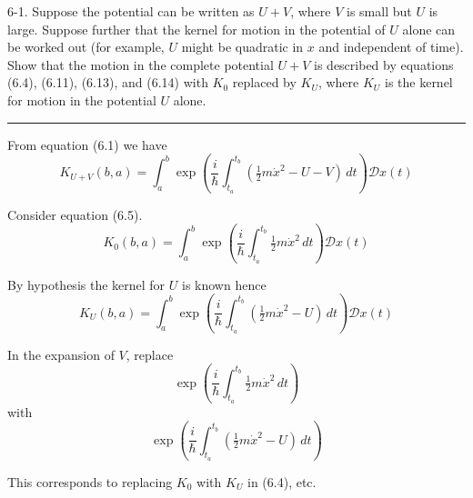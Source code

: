 \documentclass[12pt]{article}
\begin{document}
6-1.
Suppose the potential can be written as $U+V$,
where $V$ is small but $U$ is large.
Suppose further that the kernel for motion in the potential of $U$ alone
can be worked out (for example, $U$ might be quadratic in $x$ and
independent of time).
Show that the motion in the complete potential $U+V$ is described by
equations (6.4), (6.11), (6.13), and (6.14) with $K_0$ replaced by $K_U$,
where $K_U$ is the kernel for motion in the potential $U$ alone.

\bigskip
\hrule

\bigskip
From equation (6.1) we have
\begin{equation*}
K_{U+V}(b,a)=\int_a^b
\exp\left(\frac{i}{\hbar}\int_{t_a}^{t_b}\left(\tfrac{1}{2}m\dot x^2-U-V\right)\,dt\right)
\mathcal Dx(t)
\end{equation*}

Consider equation (6.5).
\begin{equation*}
K_0(b,a)=\int_a^b\exp\left(\frac{i}{\hbar}\int_{t_a}^{t_b}\tfrac{1}{2}m\dot x^2\,dt\right)
\mathcal Dx(t)
\tag{6.5}
\end{equation*}

By hypothesis the kernel for $U$ is known hence
\begin{equation*}
K_U(b,a)=\int_a^b
\exp\left(\frac{i}{\hbar}\int_{t_a}^{t_b}\left(\tfrac{1}{2}m\dot x^2-U\right)\,dt\right)
\mathcal Dx(t)
\end{equation*}

In the expansion of $V$, replace
\begin{equation*}
\exp\left(\frac{i}{\hbar}\int_{t_a}^{t_b}\tfrac{1}{2}m\dot x^2\,dt\right)
\end{equation*}
with
\begin{equation*}
\exp\left(\frac{i}{\hbar}\int_{t_a}^{t_b}\left(\tfrac{1}{2}m\dot x^2-U\right)\,dt\right)
\end{equation*}

This corresponds to replacing $K_0$ with $K_U$ in (6.4), etc.
\end{document}
